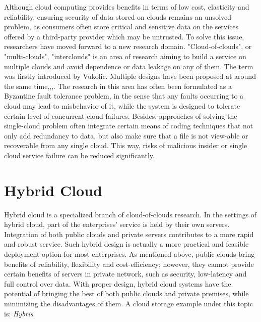 Although cloud computing provides benefits in terms of low cost, elasticity and reliability, ensuring security of data stored on clouds remains an unsolved problem, as consumers often store critical and sensitive data on the services offered by a third-party provider which may be untrusted. To solve this issue, researchers have moved forward to  a new research domain\cite{aizain2012multiclouds}. "Cloud-of-clouds", or "multi-clouds", "interclouds" is an area of research aiming to build a service on multiple clouds and avoid dependence or data leakage on any of them. The term was firstly introduced by Vukolic\cite{vukolic2010byzantine}. Multiple designs have been proposed at around the same time\cite{bowers2009hail},\cite{abu2010racs},\cite{cachin2010dependable},\cite{bessani2013depsky}. The research in this area has often been formulated as a Byzantine fault tolerance problem\cite{lamport1982byzantine}, in the sense that any faults occurring to a cloud may lead to misbehavior of it, while the system is designed to tolerate certain level of concurrent cloud failures. Besides, approaches of solving the single-cloud problem often integrate certain means of coding techniques that not only add redundancy to data, but also make sure that a file is not view-able or recoverable from any single cloud. This way, risks of malicious insider or single cloud service failure can be reduced significantly.

\section{Hybrid Cloud}
\label{s:hybridcloud}

Hybrid cloud is a specialized branch of cloud-of-clouds research. In the settings of hybrid cloud, part of the enterprises' service is held by their own servers. Integration of both public clouds and private servers contributes to a more rapid and robust service. Such hybrid design is actually a more practical and feasible deployment option for most enterprises. As mentioned above, public clouds bring benefits of reliability, flexibility and cost-efficiency; however, they cannot provide certain benefits of servers in private network, such as security, low-latency and full control over data. With proper design, hybrid cloud systems have the potential of bringing the best of both public clouds and private premises, while minimizing the disadvantages of them. A cloud storage example under this topic is: \textit{Hybris}\cite{dobre2014hybris}.

